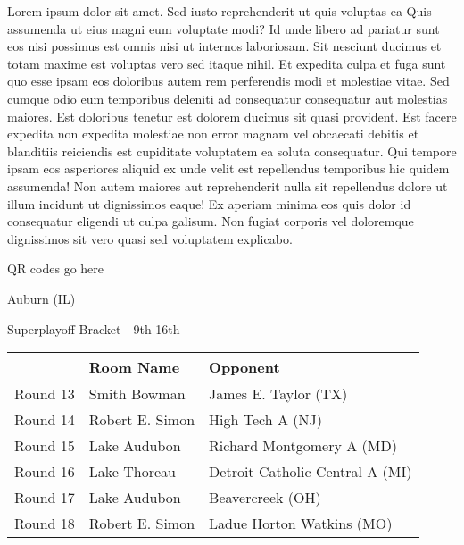\documentclass{article}%
\begin{document}
\vspace*{8pt}%
\linebreak%
\newline%
\newline%
Lorem ipsum dolor sit amet. Sed iusto reprehenderit ut quis voluptas ea Quis assumenda ut eius magni eum voluptate modi? Id unde libero ad pariatur sunt eos nisi possimus est omnis nisi ut internos laboriosam. Sit nesciunt ducimus et totam maxime est voluptas vero sed itaque nihil. Et expedita culpa et fuga sunt quo esse ipsam eos doloribus autem rem perferendis modi et molestiae vitae.\newline%
\newline%
Sed cumque odio eum temporibus deleniti ad consequatur consequatur aut molestias maiores. Est doloribus tenetur est dolorem ducimus sit quasi provident. Est facere expedita non expedita molestiae non error magnam vel obcaecati debitis et blanditiis reiciendis est cupiditate voluptatem ea soluta consequatur. Qui tempore ipsam eos asperiores aliquid ex unde velit est repellendus temporibus hic quidem assumenda!\newline%
\newline%
Non autem maiores aut reprehenderit nulla sit repellendus dolore ut illum incidunt ut dignissimos eaque! Ex aperiam minima eos quis dolor id consequatur eligendi ut culpa galisum. Non fugiat corporis vel doloremque dignissimos sit vero quasi sed voluptatem explicabo.\newline%
\newline%
%
\vspace*{30pt}%
\begin{center}%
\begin{Huge}%
QR codes go here%
\end{Huge}%
\end{center}%
\newpage%
\begin{center}%
\begin{Huge}%
Auburn (IL)%
\end{Huge}%
\vspace*{8pt}%
\linebreak%
\begin{Large}%
Superplayoff Bracket {-} 9th{-}16th%
\end{Large}%
\end{center}%
%
\begin{tabularx}{\textwidth}{|c|Y|Y|}%
\hline%
&Room Name&Opponent\\%
\hline%
Round 13&Smith Bowman&James E. Taylor (TX)\\%
Round 14&Robert E. Simon&High Tech A (NJ)\\%
Round 15&Lake Audubon&Richard Montgomery A (MD)\\%
Round 16&Lake Thoreau&Detroit Catholic Central A (MI)\\%
Round 17&Lake Audubon&Beavercreek (OH)\\%
Round 18&Robert E. Simon&Ladue Horton Watkins (MO)\\%
\hline%
\end{tabularx}%
\end{document}
